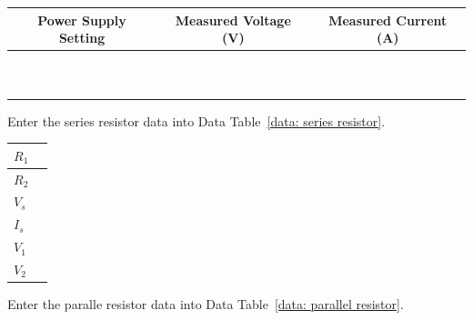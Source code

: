 \documentclass[addpoints]{physlabs}
\begin{document}
\begin{postlab}
    \begin{center}
        \captionsetup{font=normalsize}
        \renewcommand{\arraystretch}{1.5}
        \begin{tabular}{|c|c|c|}
            \hline
            \rowcolor{gray!20}
            \textbf{Power Supply Setting} & \textbf{Measured Voltage} (V) & \textbf{Measured Current} (A)
            \\
            \hline
            & & \\ \hline
            & & \\ \hline
            & & \\ \hline
            & & \\ \hline
            & & \\ \hline
            & & \\ \hline
            & & \\ \hline
            & & \\ \hline
            & & \\ \hline
            & & \\ \hline
        \end{tabular}
    \end{center}

    \filbreak
    \question[\half] Enter the series resistor data into Data Table~\ref{data: series resistor}.
    
    \begin{center}
        \captionsetup{font=normalsize}
        \renewcommand{\arraystretch}{1.5}
        \begin{tabular}{|>{\centering\arraybackslash}p{3cm}|>{\centering\arraybackslash}p{3cm}|}
            \hline
            $R_1$ & \\ \hline
            $R_2$ & \\ \hline
            $V_s$ & \\ \hline
            $I_s$ & \\ \hline
            $V_1$ & \\ \hline
            $V_2$ & \\ \hline
        \end{tabular}
    \end{center}

    \filbreak
    \question[\half] Enter the paralle resistor data into Data Table~\ref{data: parallel resistor}.
    

\end{postlab}
\end{document}
